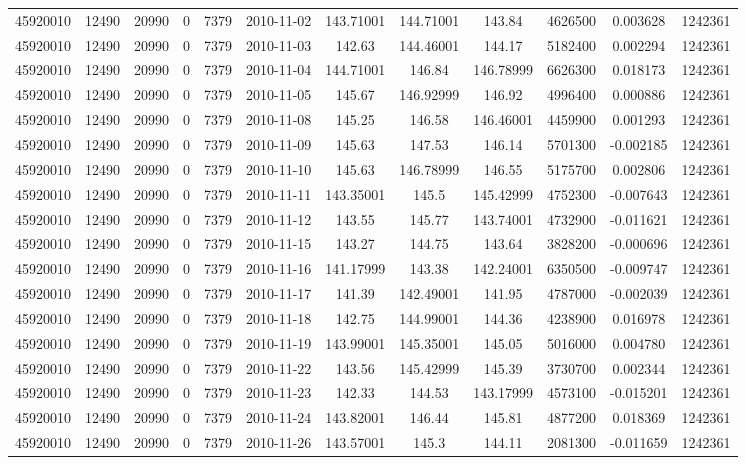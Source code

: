 \documentclass[12 pt]{article}
\begin{document}
\begin{flushleft}
\begin{table}[h]
\begin{tabular}{c c c c c c c c c c c c }
45920010 & 12490 & 20990 & 0 & 7379 & 2010-11-02 & 143.71001 & 144.71001 & 143.84 & 4626500 & 0.003628 & 1242361\\
45920010 & 12490 & 20990 & 0 & 7379 & 2010-11-03 & 142.63 & 144.46001 & 144.17 & 5182400 & 0.002294 & 1242361\\
45920010 & 12490 & 20990 & 0 & 7379 & 2010-11-04 & 144.71001 & 146.84 & 146.78999 & 6626300 & 0.018173 & 1242361\\
45920010 & 12490 & 20990 & 0 & 7379 & 2010-11-05 & 145.67 & 146.92999 & 146.92 & 4996400 & 0.000886 & 1242361\\
45920010 & 12490 & 20990 & 0 & 7379 & 2010-11-08 & 145.25 & 146.58 & 146.46001 & 4459900 & 0.001293 & 1242361\\
45920010 & 12490 & 20990 & 0 & 7379 & 2010-11-09 & 145.63 & 147.53 & 146.14 & 5701300 & -0.002185 & 1242361\\
45920010 & 12490 & 20990 & 0 & 7379 & 2010-11-10 & 145.63 & 146.78999 & 146.55 & 5175700 & 0.002806 & 1242361\\
45920010 & 12490 & 20990 & 0 & 7379 & 2010-11-11 & 143.35001 & 145.5 & 145.42999 & 4752300 & -0.007643 & 1242361\\
45920010 & 12490 & 20990 & 0 & 7379 & 2010-11-12 & 143.55 & 145.77 & 143.74001 & 4732900 & -0.011621 & 1242361\\
45920010 & 12490 & 20990 & 0 & 7379 & 2010-11-15 & 143.27 & 144.75 & 143.64 & 3828200 & -0.000696 & 1242361\\
45920010 & 12490 & 20990 & 0 & 7379 & 2010-11-16 & 141.17999 & 143.38 & 142.24001 & 6350500 & -0.009747 & 1242361\\
45920010 & 12490 & 20990 & 0 & 7379 & 2010-11-17 & 141.39 & 142.49001 & 141.95 & 4787000 & -0.002039 & 1242361\\
45920010 & 12490 & 20990 & 0 & 7379 & 2010-11-18 & 142.75 & 144.99001 & 144.36 & 4238900 & 0.016978 & 1242361\\
45920010 & 12490 & 20990 & 0 & 7379 & 2010-11-19 & 143.99001 & 145.35001 & 145.05 & 5016000 & 0.004780 & 1242361\\
45920010 & 12490 & 20990 & 0 & 7379 & 2010-11-22 & 143.56 & 145.42999 & 145.39 & 3730700 & 0.002344 & 1242361\\
45920010 & 12490 & 20990 & 0 & 7379 & 2010-11-23 & 142.33 & 144.53 & 143.17999 & 4573100 & -0.015201 & 1242361\\
45920010 & 12490 & 20990 & 0 & 7379 & 2010-11-24 & 143.82001 & 146.44 & 145.81 & 4877200 & 0.018369 & 1242361\\
45920010 & 12490 & 20990 & 0 & 7379 & 2010-11-26 & 143.57001 & 145.3 & 144.11 & 2081300 & -0.011659 & 1242361\\

\end{tabular}
\end{table}
\end{flushleft}
\end{document}
